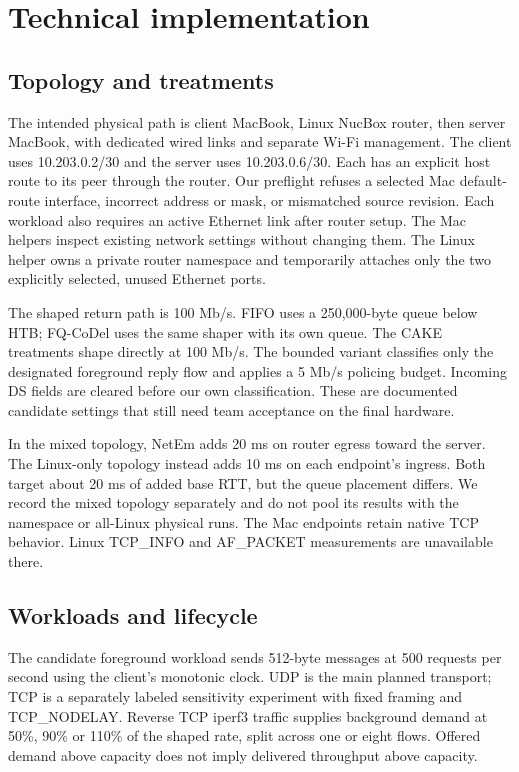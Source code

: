 \section{Technical implementation}
\subsection{Topology and treatments}
The intended physical path is client MacBook, Linux NucBox router, then server
MacBook, with dedicated wired links and separate Wi-Fi management. The client
uses 10.203.0.2/30 and the server uses 10.203.0.6/30. Each has an explicit host
route to its peer through the router. Our preflight refuses a selected Mac
default-route interface, incorrect address or mask, or mismatched source revision.
Each workload also requires an active Ethernet link after router setup.
The Mac helpers inspect existing network settings
without changing them. The Linux helper owns a private router namespace and
temporarily attaches only the two explicitly selected, unused Ethernet ports.

The shaped return path is 100 Mb/s. FIFO uses a 250,000-byte queue below HTB;
FQ-CoDel uses the same shaper with its own queue. The CAKE treatments shape
directly at 100 Mb/s. The bounded variant classifies only the designated
foreground reply flow and applies a 5 Mb/s policing budget. Incoming DS fields
are cleared before our own classification. These are documented candidate
settings that still need team acceptance on the final hardware.

In the mixed topology, NetEm adds 20 ms on router egress toward the server.
The Linux-only topology instead adds 10 ms on each endpoint's ingress.
Both target about 20 ms of added base RTT, but the queue placement differs.
We record the mixed topology separately and do not pool its results with the
namespace or all-Linux physical runs. The Mac endpoints retain native TCP
behavior. Linux TCP\_INFO and AF\_PACKET measurements are unavailable there.

\subsection{Workloads and lifecycle}
The candidate foreground workload sends 512-byte messages at 500 requests per
second using the client's monotonic clock. UDP is the main planned transport;
TCP is a separately labeled sensitivity experiment with fixed framing and
TCP\_NODELAY. Reverse TCP iperf3 traffic supplies background demand at 50\%,
90\% or 110\% of the shaped rate, split across one or eight flows. Offered
demand above capacity does not imply delivered throughput above capacity.

